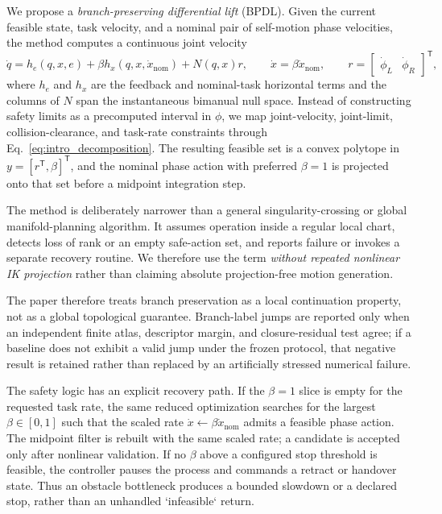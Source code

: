 \documentclass[preprint,12pt]{elsarticle}
\newcommand{\T}{^{\mathsf T}}
\newcommand{\method}{BPDL}
\begin{document}
We propose a \emph{branch-preserving differential lift} (\method). Given the current feasible state, task velocity, and a nominal pair of self-motion phase velocities, the method computes a continuous joint velocity
\begin{equation}
\dot q = h_e(q,x,e)+\beta h_x(q,x,\dot x_{\mathrm{nom}})+N(q,x)r,
\qquad
\dot x=\beta\dot x_{\mathrm{nom}},
\qquad
r=\begin{bmatrix}\dot\phi_L & \dot\phi_R\end{bmatrix}\T,
\label{eq:intro_decomposition}
\end{equation}
where $h_e$ and $h_x$ are the feedback and nominal-task horizontal terms and the columns of $N$ span the instantaneous bimanual null space. Instead of constructing safety limits as a precomputed interval in $\phi$, we map joint-velocity, joint-limit, collision-clearance, and task-rate constraints through Eq.~\eqref{eq:intro_decomposition}. The resulting feasible set is a convex polytope in $y=[r\T,\beta]\T$, and the nominal phase action with preferred $\beta=1$ is projected onto that set before a midpoint integration step.

The method is deliberately narrower than a general singularity-crossing or global manifold-planning algorithm. It assumes operation inside a regular local chart, detects loss of rank or an empty safe-action set, and reports failure or invokes a separate recovery routine. We therefore use the term \emph{without repeated nonlinear IK projection} rather than claiming absolute projection-free motion generation.

The paper therefore treats branch preservation as a local continuation property, not as a global topological guarantee. Branch-label jumps are reported only when an independent finite atlas, descriptor margin, and closure-residual test agree; if a baseline does not exhibit a valid jump under the frozen protocol, that negative result is retained rather than replaced by an artificially stressed numerical failure.

The safety logic has an explicit recovery path. If the $\beta=1$ slice is empty for the requested task rate, the same reduced optimization searches for the largest $\beta\in[0,1]$ such that the scaled rate $\dot x\leftarrow\beta\dot x_{\mathrm{nom}}$ admits a feasible phase action. The midpoint filter is rebuilt with the same scaled rate; a candidate is accepted only after nonlinear validation. If no $\beta$ above a configured stop threshold is feasible, the controller pauses the process and commands a retract or handover state. Thus an obstacle bottleneck produces a bounded slowdown or a declared stop, rather than an unhandled `infeasible` return.
\end{document}
